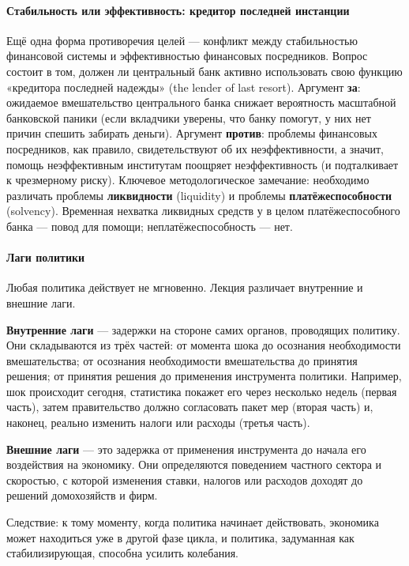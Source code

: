 \documentclass[11pt,a4paper]{article}
\begin{document}
\paragraph{Стабильность или эффективность: кредитор последней инстанции}

Ещё одна форма противоречия целей --- конфликт между стабильностью финансовой системы и эффективностью финансовых посредников. Вопрос состоит в том, должен ли центральный банк активно использовать свою функцию «кредитора последней надежды» (the lender of last resort). Аргумент \textbf{за}: ожидаемое вмешательство центрального банка снижает вероятность масштабной банковской паники (если вкладчики уверены, что банку помогут, у них нет причин спешить забирать деньги). Аргумент \textbf{против}: проблемы финансовых посредников, как правило, свидетельствуют об их неэффективности, а значит, помощь неэффективным институтам поощряет неэффективность (и подталкивает к чрезмерному риску). Ключевое методологическое замечание: необходимо различать проблемы \textbf{ликвидности} (liquidity) и проблемы \textbf{платёжеспособности} (solvency). Временная нехватка ликвидных средств у в целом платёжеспособного банка --- повод для помощи; неплатёжеспособность --- нет.

\paragraph{Лаги политики}

Любая политика действует не мгновенно. Лекция различает внутренние и внешние лаги.

\textbf{Внутренние лаги} --- задержки на стороне самих органов, проводящих политику. Они складываются из трёх частей: от момента шока до осознания необходимости вмешательства; от осознания необходимости вмешательства до принятия решения; от принятия решения до применения инструмента политики. Например, шок происходит сегодня, статистика покажет его через несколько недель (первая часть), затем правительство должно согласовать пакет мер (вторая часть) и, наконец, реально изменить налоги или расходы (третья часть).

\textbf{Внешние лаги} --- это задержка от применения инструмента до начала его воздействия на экономику. Они определяются поведением частного сектора и скоростью, с которой изменения ставки, налогов или расходов доходят до решений домохозяйств и фирм.

Следствие: к тому моменту, когда политика начинает действовать, экономика может находиться уже в другой фазе цикла, и политика, задуманная как стабилизирующая, способна усилить колебания.
\end{document}
